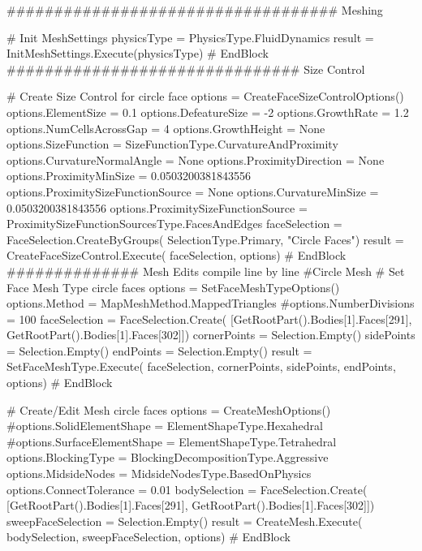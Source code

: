 ################################### Meshing

# Init MeshSettings
physicsType = PhysicsType.FluidDynamics
result = InitMeshSettings.Execute(physicsType)
# EndBlock
############################### Size Control 

# Create Size Control for circle face
options = CreateFaceSizeControlOptions()
options.ElementSize = 0.1
options.DefeatureSize = -2
options.GrowthRate = 1.2
options.NumCellsAcrossGap = 4
options.GrowthHeight = None
options.SizeFunction = SizeFunctionType.CurvatureAndProximity
options.CurvatureNormalAngle = None
options.ProximityDirection = None
options.ProximityMinSize = 0.0503200381843556
options.ProximitySizeFunctionSource = None
options.CurvatureMinSize = 0.0503200381843556
options.ProximitySizeFunctionSource =
ProximitySizeFunctionSourcesType.FacesAndEdges
faceSelection = FaceSelection.CreateByGroups(
    SelectionType.Primary, 
                                             "Circle Faces")
result = CreateFaceSizeControl.Execute(
    faceSelection, options)
# EndBlock
############## Mesh Edits compile line by line
#Circle Mesh
# Set Face Mesh Type circle faces
options = SetFaceMeshTypeOptions()
options.Method = MapMeshMethod.MappedTriangles
#options.NumberDivisions = 100
faceSelection = FaceSelection.Create(
    [GetRootPart().Bodies[1].Faces[291],
    GetRootPart().Bodies[1].Faces[302]])
cornerPoints = Selection.Empty()
sidePoints = Selection.Empty()
endPoints = Selection.Empty()
result = SetFaceMeshType.Execute(
    faceSelection, cornerPoints,
    sidePoints, endPoints, options)
# EndBlock

# Create/Edit Mesh circle faces
options = CreateMeshOptions()
#options.SolidElementShape = ElementShapeType.Hexahedral
#options.SurfaceElementShape = ElementShapeType.Tetrahedral
options.BlockingType = BlockingDecompositionType.Aggressive
options.MidsideNodes = MidsideNodesType.BasedOnPhysics
options.ConnectTolerance = 0.01
bodySelection = FaceSelection.Create(
    [GetRootPart().Bodies[1].Faces[291],
    GetRootPart().Bodies[1].Faces[302]])
sweepFaceSelection = Selection.Empty()
result = CreateMesh.Execute(
    bodySelection, 
    sweepFaceSelection, options)
# EndBlock